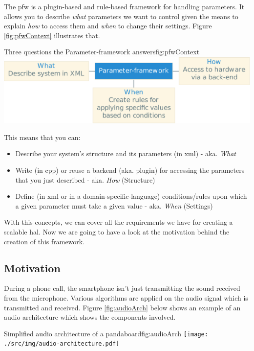 The \gls{pfw} is a plugin-based and rule-based framework for handling parameters.
It allows you to describe \emph{what} parameters we want to control given the means to explain \emph{how} to access
them and \emph{when} to change their settings.
Figure \ref{fig:pfwContext} illustrates that.

\begin{figureGraphics}{Three questions the Parameter-framework answers}{fig:pfwContext}
    \includegraphics[width=\textwidth]{../presentation/src/img/pfwContext.pdf}
\end{figureGraphics}

This means that you can:
\begin{itemize}
    \item Describe your system's structure and its parameters (in \gls{xml}) - aka. \emph{What}
    \item Write (in \gls{cpp}) or reuse a backend (aka. plugin) for accessing the parameters that you just described - aka. \emph{How} (Structure)
    \item Define (in \gls{xml} or in a domain-specific-language) conditions/rules upon which a given parameter must take a given value - aka. \emph{When} (Settings)
\end{itemize}

With this concepts, we can cover all the requirements we have for creating a scalable \gls{hal}.
Now we are going to have a look at the motivation behind the creation of this framework.

\subsection{Motivation}
During a phone call, the smartphone isn't just transmitting the sound received from the microphone. Various algorithms are
applied on the audio signal which is transmitted and received.
Figure \ref{fig:audioArch} below shows an example of an audio architecture which shows the components involved.

\begin{figureGraphics}{Simplified audio architecture of a pandaboard}{fig:audioArch}
    \texttt{[image: ./src/img/audio-architecture.pdf]}
\end{figureGraphics}

